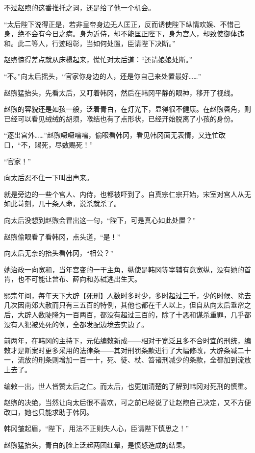 不过赵煦的这番推托之词，还是给了他一个机会。

“太后陛下说得正是，若非皇帝身边无人匡正，反而诱使陛下纵情欢娱、不惜己身，绝不会有今日之病。身为近侍，却不能匡正陛下，身为宫人，却致使御体违和。此二等人，行迹昭彰，当如何处置，臣请陛下决断。”

赵煦惊得差点就从床榻起来，慌忙对太后道：“还请娘娘处断。”

“不。”向太后摇头，“官家你身边的人，还是你自己来处置最好……”

赵煦猛抬头，先看太后，又盯着韩冈，然后在韩冈平静的眼神，移开了视线。

赵煦的容貌还是如孩一般，泛着青白，在灯光下，显得很不健康。在赵煦唇角，则已经可以看见绒绒的胡须，喉结也有了点形状，已经开始脱离了小孩的身份。

“逐出宫外……”赵煦嗫嗫嚅嚅，偷眼看韩冈，看见韩冈面无表情，又连忙改口，“不，赐死，尽数赐死！”

“官家！”

向太后忍不住一下叫出声来。

就是旁边的一些个宫人、内侍，也都被吓到了。自真宗仁宗开始，宋室对宫人从无如此苛刻，几十条人命，说杀就杀了。

向太后没想到赵煦会冒出这一句，“陛下，可是真心如此处置？”

赵煦偷眼看了看韩冈，点头道，“是！”

向太后无奈的抬头看韩冈，“相公？”

她治政一向宽和，当年宫变的一干主角，纵使是韩冈等宰辅有意宽纵，没有她的首肯，也不可能让曾布、薛向和苏轼逃出生天。

熙宗年间，每年天下大辟【死刑】人数时多时少，多时超过三千，少的时候、除去几次因南郊大赦而只有三五百的特例，其他也都在千人以上，但自从向太后垂帘之后，大辟人数陡降为一百两百，都没有超过三百的，除了十恶和谋杀重罪，几乎都没有人犯被处死的例，全都发配边境去实边了。

前两年，在韩冈的主持下，元佑编敕新成——相对于宽泛且多不合时宜的刑统，编敕才是断案时更多采用的法律条——其对刑罚条款进行了大幅修改，大辟条减二十一，流放的刑条则增加一百一十，死、徒、杖、笞诸刑减少的条款，全都加到流放上去了。

编敕一出，世人皆赞太后之仁。而太后，也更加清楚的了解到韩冈对死刑的慎重。

赵煦的决绝，当然让向太后很不喜欢，可之前已经说了让赵煦自己决定，又不方便改口，她也只能求助于韩冈。

韩冈皱起眉，“陛下，用法不正则失人心，臣请陛下慎思之！”

赵煦猛抬头，青白的脸上泛起两团红晕，是愤怒造成的结果。

